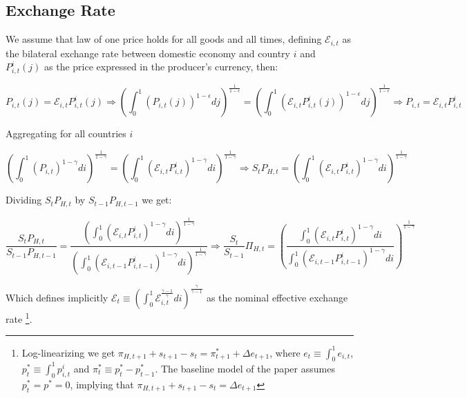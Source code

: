 \documentclass{article}
\newcommand{\E}{\mathcal{E}}
\begin{document}
\subsection{Exchange Rate}
We assume that law of one price holds for all goods and all times, defining $\E_{i,t}$ as the bilateral exchange rate between domestic economy and country $i$ and $P^i_{i,t}(j)$ as the price expressed in the producer's currency, then:

\begin{equation}
    P_{i,t}(j) = \E_{i,t} P^i_{i,t}(j) \Rightarrow \left( \int^1_0 \left(P_{i,t}(j) \right)^{1-\epsilon} dj \right)^{\frac{1}{1-\epsilon}} = \left( \int^1_0 \left(\E_{i,t} P^i_{i,t}(j) \right)^{1-\epsilon} dj \right)^{\frac{1}{1-\epsilon}} \Rightarrow P_{i,t} = \E_{i,t} P^i_{i,t}
\end{equation}


Aggregating for all countries $i$

\begin{equation}
    \left( \int^1_0 \left(P_{i,t} \right)^{1-\gamma} di \right)^{\frac{1}{1-\gamma}} = \left( \int^1_0 \left(\E_{i,t} P^i_{i,t} \right)^{1-\gamma} di \right)^{\frac{1}{1-\gamma}} \Rightarrow S_t P_{H,t} = \left( \int^1_0 \left(\E_{i,t} P^i_{i,t} \right)^{1-\gamma} di \right)^{\frac{1}{1-\gamma}}
\end{equation}

Dividing $S_t P_{H,t}$ by $S_{t-1} P_{H,t-1}$ we get:

\begin{equation}
    \label{fx}
    \frac{S_t P_{H,t}}{S_{t-1} P_{H,t-1}} = \frac{\left( \int^1_0 \left(\E_{i,t} P^i_{i,t} \right)^{1-\gamma} di \right)^{\frac{1}{1-\gamma}}}{\left( \int^1_0 \left(\E_{i,t-1} P^i_{i,t-1} \right)^{1-\gamma} di \right)^{\frac{1}{1-\gamma}}} \Rightarrow \frac{S_t}{S_{t-1}}\Pi_{H,t} = \left(\frac{\int^1_0 \left(\E_{i,t} P^i_{i,t} \right)^{1-\gamma} di }{\int^1_0 \left(\E_{i,t-1} P^i_{i,t-1} \right)^{1-\gamma} di} \right)^{\frac{1}{1-\gamma}}
\end{equation}

Which defines implicitly $\E_{t} \equiv \left( \int^1_0 \E_{i,t}^{\frac{\gamma-1}{\gamma}} di \right)^{\frac{\gamma}{\gamma-1}}$ as the nominal effective exchange rate \footnote{Log-linearizing we get $\pi_{H,t+1} + s_{t+1} - s_t = \pi^*_{t+1} + \Delta e_{t+1}$, where $e_t \equiv \int^1_0 e_{i,t}$, $p_t^* \equiv \int^1_0 p^i_{i,t}$ and $\pi^*_t \equiv p_t^* - p_{t-1}^*$. The baseline model of the paper assumes $p_t^* = p^* = 0$, implying that $\pi_{H,t+1} + s_{t+1} - s_t = \Delta e_{t+1}$}.
\end{document}
